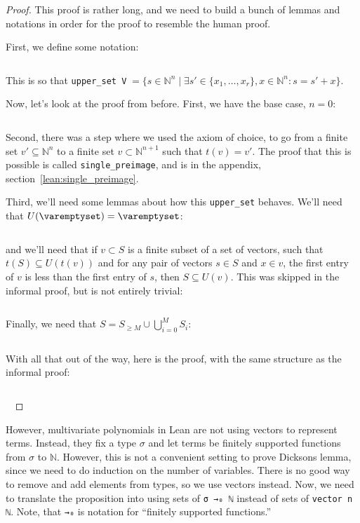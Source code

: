 \documentclass[a4paper, 12pt]{article}
\newcommand{\N}{\mathbb{N}}
\newcommand{\lean}[1]{\texttt{#1}}
\theoremstyle{changedot}
\theoremstyle{changedotbreak}
\theoremstyle{nonumberplain}
\newtheorem{proof}{Proof}
\begin{document}
\begin{proof}
  This proof is rather long, and we need to build a bunch of lemmas and notations in order for the proof to resemble the human proof.

  First, we define some notation:

  \inputminted[firstline=65, lastline=70]{lean}{../src/dickson.lean}

  This is so that \lean{upper_set V}$\;= \{s \in \N^{n} \mid \exists s' \in \{x_{1}, \dots, x_{r}\}, x \in \N^{n} : s = s' + x\}.$

  Now, let's look at the proof from before. First, we have the base case, $n = 0$:
  \inputminted[firstline=72, lastline=93]{lean}{../src/dickson.lean}

  Second, there was a step where we used the axiom of choice, to go from a finite set $v' \subseteq \N^{n}$ to a finite set $v \subset \N^{n+1}$ such that $t(v) = v'$. The proof that this is possible is called \lean{single_preimage}, and is in the appendix, section~\ref{lean:single_preimage}.

  Third, we'll need some lemmas about how this \lean{upper_set} behaves. We'll need that $U(\varemptyset) = \varemptyset$:

  \inputminted[firstline=95, lastline=102]{lean}{../src/dickson.lean}

  and we'll need that if $v \subset S$ is a finite subset of a set of vectors, such that $t(S) \subseteq U(t(v))$ and for any pair of vectors $s \in S$ and $x \in v$, the first entry of $v$ is less than the first entry of $s$, then $S \subseteq U(v)$. This was skipped in the informal proof, but is not entirely trivial:

  \inputminted[firstline=134, lastline=159]{lean}{../src/dickson.lean}

  Finally, we need that $S = S_{\ge M} \cup \bigcup_{i=0}^{M} S_{i}$:

  \inputminted[firstline=104, lastline=132]{lean}{../src/dickson.lean}

  With all that out of the way, here is the proof, with the same structure as the informal proof:

  \inputminted[firstline=161]{lean}{../src/dickson.lean}
  ~
\end{proof}

However, multivariate polynomials in Lean are not using vectors to represent terms. Instead, they fix a type $\sigma$ and let terms be finitely supported functions from $\sigma$ to $\N$. However, this is not a convenient setting to prove Dicksons lemma, since we need to do induction on the number of variables. There is no good way to remove and add elements from types, so we use vectors instead. Now, we need to translate the proposition into using sets of \lean{σ →₀ ℕ} instead of sets of \lean{vector n ℕ}. Note, that \lean{→₀} is notation for ``finitely supported functions.''
\end{document}
